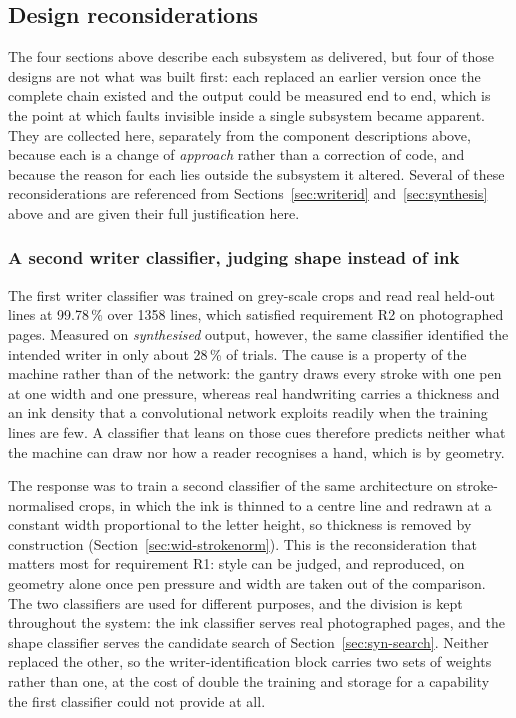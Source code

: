 \subsection{Design reconsiderations}
\label{sec:later}

The four sections above describe each subsystem as delivered, but four of those designs are not what was built first: each replaced an earlier version once the complete chain existed and the output could be measured end to end, which is the point at which faults invisible inside a single subsystem became apparent. They are collected here, separately from the component descriptions above, because each is a change of \emph{approach} rather than a correction of code, and because the reason for each lies outside the subsystem it altered. Several of these reconsiderations are referenced from Sections~\ref{sec:writerid} and~\ref{sec:synthesis} above and are given their full justification here.

\subsubsection{A second writer classifier, judging shape instead of ink}
\label{sec:later-strokenorm}

The first writer classifier was trained on grey-scale crops and read real held-out lines at 99.78\,\% over 1358 lines, which satisfied requirement R2 on photographed pages. Measured on \emph{synthesised} output, however, the same classifier identified the intended writer in only about 28\,\% of trials. The cause is a property of the machine rather than of the network: the gantry draws every stroke with one pen at one width and one pressure, whereas real handwriting carries a thickness and an ink density that a convolutional network exploits readily when the training lines are few. A classifier that leans on those cues therefore predicts neither what the machine can draw nor how a reader recognises a hand, which is by geometry.

The response was to train a second classifier of the same architecture on stroke-normalised crops, in which the ink is thinned to a centre line and redrawn at a constant width proportional to the letter height, so thickness is removed by construction (Section~\ref{sec:wid-strokenorm}). This is the reconsideration that matters most for requirement R1: style can be judged, and reproduced, on geometry alone once pen pressure and width are taken out of the comparison. The two classifiers are used for different purposes, and the division is kept throughout the system: the ink classifier serves real photographed pages, and the shape classifier serves the candidate search of Section~\ref{sec:syn-search}. Neither replaced the other, so the writer-identification block carries two sets of weights rather than one, at the cost of double the training and storage for a capability the first classifier could not provide at all.

